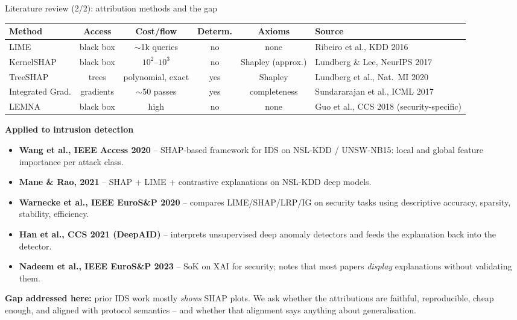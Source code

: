 \documentclass[10pt,aspectratio=169]{beamer}
\begin{document}
\begin{frame}{Literature review (2/2): attribution methods and the gap}
\scriptsize
\begin{tabular}{lccccl}
\toprule
\textbf{Method} & \textbf{Access} & \textbf{Cost/flow} & \textbf{Determ.} & \textbf{Axioms} & \textbf{Source} \\
\midrule
LIME              & black box & $\sim$1k queries & no  & none        & Ribeiro et al., KDD 2016 \\
KernelSHAP        & black box & $10^2$--$10^3$   & no  & Shapley (approx.) & Lundberg \& Lee, NeurIPS 2017 \\
TreeSHAP          & trees     & polynomial, exact & yes & Shapley     & Lundberg et al., Nat.\ MI 2020 \\
Integrated Grad.  & gradients & $\sim$50 passes  & yes & completeness & Sundararajan et al., ICML 2017 \\
LEMNA             & black box & high             & no  & none        & Guo et al., CCS 2018 (security-specific) \\
\bottomrule
\end{tabular}

\vspace{0.9em}
\normalsize\textbf{Applied to intrusion detection}
\vspace{0.2em}
\scriptsize
\begin{itemize}\itemsep2pt
  \item \textbf{Wang et al., IEEE Access 2020} -- SHAP-based framework for IDS on NSL-KDD /
        UNSW-NB15: local and global feature importance per attack class.
  \item \textbf{Mane \& Rao, 2021} -- SHAP + LIME + contrastive explanations on NSL-KDD deep models.
  \item \textbf{Warnecke et al., IEEE EuroS\&P 2020} -- compares LIME/SHAP/LRP/IG on
        security tasks using descriptive accuracy, sparsity, stability, efficiency.
  \item \textbf{Han et al., CCS 2021 (DeepAID)} -- interprets unsupervised deep anomaly
        detectors and feeds the explanation back into the detector.
  \item \textbf{Nadeem et al., IEEE EuroS\&P 2023} -- SoK on XAI for security; notes that most
        papers \emph{display} explanations without validating them.
\end{itemize}
\vspace{0.4em}
\normalsize\textbf{Gap addressed here:} prior IDS work mostly \emph{shows} SHAP plots. We ask
whether the attributions are faithful, reproducible, cheap enough, and aligned
with protocol semantics -- and whether that alignment says anything about
generalisation.
\end{frame}
\end{document}
